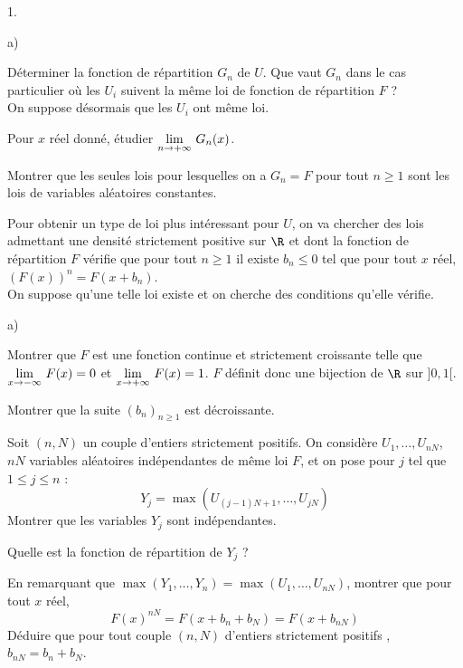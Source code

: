 \documentclass[11pt]{article}%
\begin{document}
\begin{noliste}{1.}
 \item 
 \begin{noliste}{a)}
  \item Déterminer la fonction de répartition 
  $G_n$ de $U$. Que vaut $G_n$ dans le cas particulier où les $U_i$ 
  suivent la même loi de fonction de répartition $F$ ?\\[.2cm]
  
  \noindent
  On suppose désormais que les $U_i$ ont même loi.
  
  \item Pour $x$ réel donné, étudier ${\displaystyle \lim_{n\to +\infty} \ }G_n(x)$.
  
  \item Montrer que les seules lois pour lesquelles on a $G_n=F$ 
  pour tout $n\geq 1$ sont les lois de variables aléatoires 
  constantes.
 \end{noliste}
 
 \item Pour obtenir un type de loi plus intéressant pour $U$, on va 
 chercher des lois admettant une densité strictement positive sur $\R$ 
 et dont la fonction de répartition $F$ vérifie que pour tout $n\geq 1$ 
 il existe $b_n\leq 0$ tel que pour tout $x$ réel, 
 $(F(x))^n=F(x+b_n)$.\\[.1cm]
 \noindent 
 On suppose qu'une telle loi existe et on cherche des conditions 
 qu'elle vérifie.
 \begin{noliste}{a)}
  \item Montrer que $F$ est une fonction continue et strictement 
  croissante telle que ${\displaystyle \lim_{x\to -\infty} \ }F(x)=0$ et 
  ${\displaystyle \lim_{x\to +\infty} \ }F(x)=1$. $F$ définit donc une bijection de $\R$ 
  sur $]0,1[$.
  
  \item Montrer que la suite $(b_n)_{n\geq 1}$ est décroissante.
  
  \item Soit $(n,N)$ un couple d'entiers strictement positifs. On 
  considère $U_1, \dots , U_{nN}$,   $nN$ variables aléatoires 
  indépendantes de même loi $F$, et on pose pour $j$ tel que  $1\leq j 
  \leq n$ : 
  \[
   Y_j=\max (U_{(j-1)N+1}, \dots , U_{jN})
  \]
  Montrer que les variables $Y_j$ sont indépendantes.
  
  \item Quelle est  la fonction de répartition de $Y_j$ ?
  
  \item En remarquant que $\max (Y_1,\dots , Y_n) = \max (U_1, 
  \dots , U_{nN})$, montrer que pour tout $x$ réel, 
  \[
   F(x)^{nN}=F(x+b_n+b_N)=F(x+b_{nN})
  \]
  Déduire que pour tout couple $(n,N)$ d'entiers strictement positifs , 
  $b_{nN}=b_n+b_N$.
  

\end{noliste}
\end{noliste}
\end{document}
